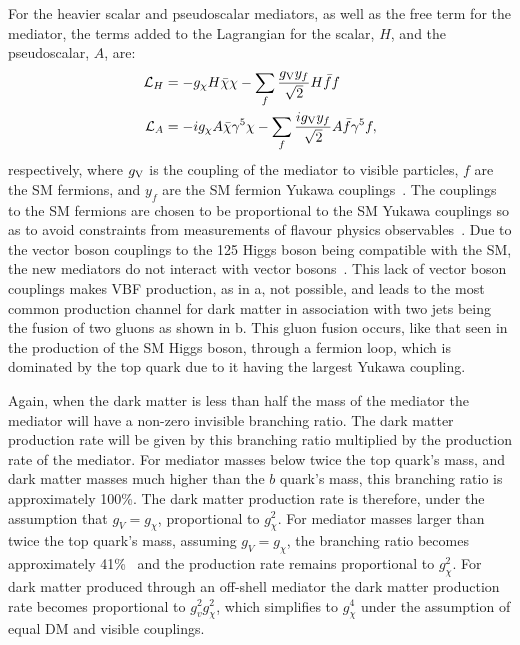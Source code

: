 For the heavier scalar and pseudoscalar mediators, as well as the free term for the mediator, the terms added to the Lagrangian for the scalar, $H$, and the pseudoscalar, $A$, are:
\begin{align}
  \mathcal{L}_{H}&=-g_{\chi}H\bar{\chi}\chi-\sum_{f}\frac{g_{\rm{V}}y_{f}}{\sqrt{2}}H\bar{f}f\\
  \mathcal{L}_{A}&=-ig_{\chi}A\bar{\chi}\gamma^{5}\chi-\sum_{f}\frac{ig_{\rm{V}}y_{f}}{\sqrt{2}}A\bar{f}\gamma^{5}f,\\
\end{align}
respectively, where $g_{\rm{V}}$ is the coupling of the mediator to visible particles, $f$ are the \ac{SM} fermions, and $y_{f}$ are the \ac{SM} fermion Yukawa couplings~\cite{PhysRevD.91.015017}. The couplings to the \ac{SM} fermions are chosen to be proportional to the \ac{SM} Yukawa couplings so as to avoid constraints from measurements of flavour physics observables~\cite{D'Ambrosio2002155}. Due to the vector boson couplings to the 125 \GeV Higgs boson being compatible with the \ac{SM}, the new mediators do not interact with vector bosons~\cite{CMS-PAS-HIG-15-002}. This lack of vector boson couplings makes \ac{VBF} production, as in a, not possible, and leads to the most common production channel for dark matter in association with two jets being the fusion of two gluons as shown in b. This gluon fusion occurs, like that seen in the production of the \ac{SM} Higgs boson, through a fermion loop, which is dominated by the top quark due to it having the largest Yukawa coupling.

Again, when the dark matter is less than half the mass of the mediator the mediator will have a non-zero invisible branching ratio. The dark matter production rate will be given by this branching ratio multiplied by the production rate of the mediator. For mediator masses below twice the top quark's mass, and dark matter masses much higher than the $b$ quark's mass, this branching ratio is approximately 100\%. The dark matter production rate is therefore, under the assumption that $g_{V}=g_{\chi}$, proportional to $g_{\chi}^{2}$. For mediator masses larger than twice the top quark's mass, assuming $g_{V}=g_{\chi}$, the branching ratio becomes approximately 41\%~\cite{ourdmpaper} and the production rate remains proportional to $g_{\chi}^{2}$. For dark matter produced through an off-shell mediator the dark matter production rate becomes proportional to $g_{v}^{2}g_{\chi}^{2}$, which simplifies to $g_{\chi}^{4}$ under the assumption of equal \ac{DM} and visible couplings.


